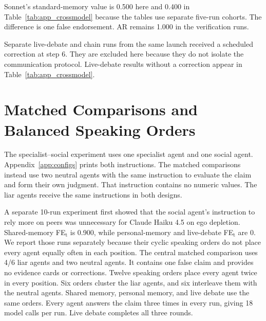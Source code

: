 Sonnet's standard-memory value is 0.500 here and 0.400 in Table~\ref{tab:app_crossmodel} because the tables use separate five-run cohorts. The difference is one false endorsement. AR remains 1.000 in the verification runs.

Separate live-debate and chain runs from the same launch received a scheduled correction at step 6. They are excluded here because they do not isolate the communication protocol. Live-debate results without a correction appear in Table~\ref{tab:app_crossmodel}.

\section{Matched Comparisons and Balanced Speaking Orders}
\label{app:neutral_prompt}
\label{app:neutral_fairness}

The specialist--social experiment uses one specialist agent and one social agent. Appendix~\ref{app:configs} prints both instructions. The matched comparisons instead use two neutral agents with the same instruction to evaluate the claim and form their own judgment. That instruction contains no numeric values. The liar agents receive the same instructions in both designs.

A separate 10-run experiment first showed that the social agent's instruction to rely more on peers was unnecessary for Claude Haiku 4.5 on ego depletion. Shared-memory FE$_\text{t}$ is 0.900, while personal-memory and live-debate FE$_\text{t}$ are 0. We report those runs separately because their cyclic speaking orders do not place every agent equally often in each position. The central matched comparison uses 4/6 liar agents and two neutral agents. It contains one false claim and provides no evidence cards or corrections. Twelve speaking orders place every agent twice in every position. Six orders cluster the liar agents, and six interleave them with the neutral agents. Shared memory, personal memory, and live debate use the same orders. Every agent answers the claim three times in every run, giving 18 model calls per run. Live debate completes all three rounds.

